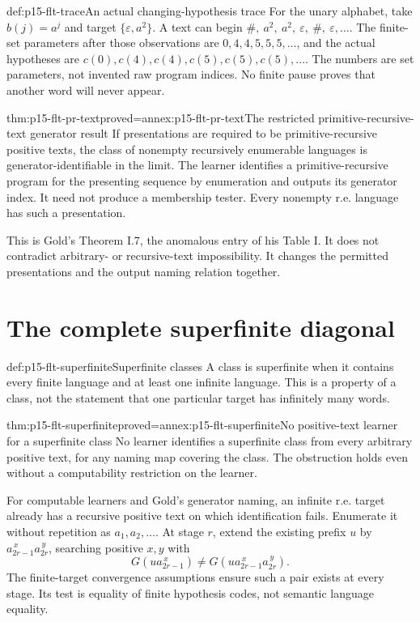 \begin{hbexample}{def:p15-flt-trace}{An actual changing-hypothesis trace}
For the unary alphabet, take \(b(j)=a^j\) and target
\(\{\varepsilon,a^2\}\). A text can begin
\(\#,\ a^2,\ a^2,\ \varepsilon,\ \#,\ \varepsilon,\ldots\).
The finite-set parameters after those observations are
\(0,4,4,5,5,5,\ldots\), and the actual hypotheses are
\(c(0),c(4),c(4),c(5),c(5),c(5),\ldots\).
The numbers are set parameters, not invented raw program indices.
No finite pause proves that another word will never appear.
\end{hbexample}

\begin{hbtheorem}{thm:p15-flt-pr-text}{proved=annex:p15-flt-pr-text}{The restricted primitive-recursive-text generator result}
If presentations are required to be primitive-recursive
positive texts, the class of nonempty recursively enumerable
languages is generator-identifiable in the limit.
The learner identifies a primitive-recursive program for
the presenting sequence by enumeration and outputs its
generator index. It need not produce a membership tester.
Every nonempty r.e. language has such a presentation.
\end{hbtheorem}

This is Gold's Theorem I.7, the anomalous entry of his
Table I. It does not contradict arbitrary- or recursive-text
impossibility. It changes the permitted presentations and
the output naming relation together.

\section{The complete superfinite diagonal}
\label{sec:p15-flt-superfinite}

\begin{hbdefinition}{def:p15-flt-superfinite}{Superfinite classes}
A class is superfinite when it contains every finite
language and at least one infinite language.
This is a property of a class, not the statement that
one particular target has infinitely many words.
\end{hbdefinition}

\begin{hbtheorem}{thm:p15-flt-superfinite}{proved=annex:p15-flt-superfinite}{No positive-text learner for a superfinite class}
No learner identifies a superfinite class from every
arbitrary positive text, for any naming map covering the
class. The obstruction holds even without a computability
restriction on the learner.

For computable learners and Gold's generator naming, an
infinite r.e. target already has a recursive positive text
on which identification fails. Enumerate it without
repetition as \(a_1,a_2,\ldots\).
At stage \(r\), extend the existing prefix \(u\) by
\(a_{2r-1}^{\,x}a_{2r}^{\,y}\), searching positive
\(x,y\) with
\[
 G(u a_{2r-1}^{\,x})
 \ne G(u a_{2r-1}^{\,x}a_{2r}^{\,y}).
\]
The finite-target convergence assumptions ensure such a
pair exists at every stage. Its test is equality of
finite hypothesis codes, not semantic language equality.
\end{hbtheorem}

